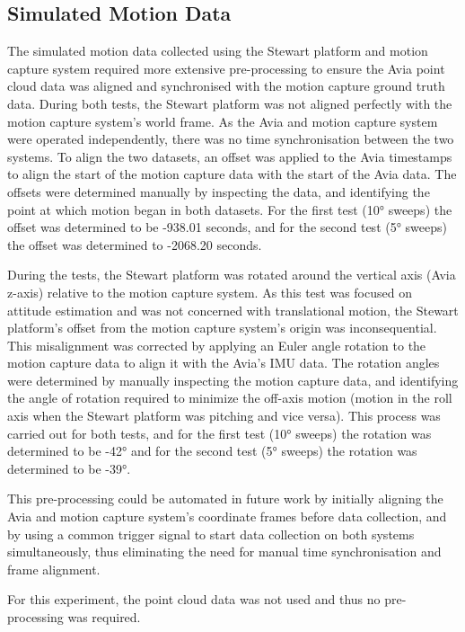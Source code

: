 \subsection{Simulated Motion Data}
\label{subsec:ch5.section1.subsec2}

The simulated motion data collected using the Stewart platform and motion capture system required more extensive pre-processing to ensure the Avia point cloud data was aligned and synchronised with the motion capture ground truth data. During both tests, the Stewart platform was not aligned perfectly with the motion capture system's world frame. As the Avia and motion capture system were operated independently, there was no time synchronisation between the two systems. To align the two datasets, an offset was applied to the Avia timestamps to align the start of the motion capture data with the start of the Avia data. The offsets were determined manually by inspecting the data, and identifying the point at which motion began in both datasets. For the first test (10° sweeps) the offset was determined to be -938.01 seconds, and for the second test (5° sweeps) the offset was determined to -2068.20 seconds.

During the tests, the Stewart platform was rotated around the vertical axis (Avia z-axis) relative to the motion capture system. As this test was focused on attitude estimation and was not concerned with translational motion, the Stewart platform's offset from the motion capture system's origin was inconsequential. This misalignment was corrected by applying an Euler angle rotation to the motion capture data to align it with the Avia's \ac{IMU} data. The rotation angles were determined by manually inspecting the motion capture data, and identifying the angle of rotation required to minimize the off-axis motion (motion in the roll axis when the Stewart platform was pitching and vice versa). This process was carried out for both tests, and for the first test (10° sweeps) the rotation was determined to be -42° and for the second test (5° sweeps) the rotation was determined to be -39°.

This pre-processing could be automated in future work by initially aligning the Avia and motion capture system's coordinate frames before data collection, and by using a common trigger signal to start data collection on both systems simultaneously, thus eliminating the need for manual time synchronisation and frame alignment.

For this experiment, the point cloud data was not used and thus no pre-processing was required.

